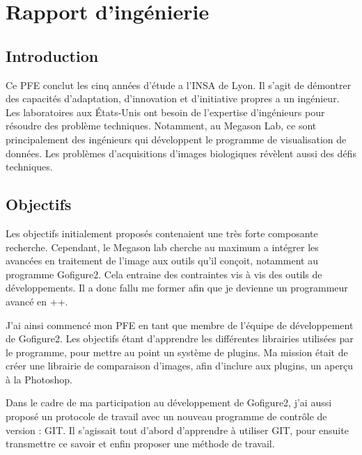 

\chapter{Rapport d'ingénierie} 








\section{Introduction}

Ce PFE conclut les cinq années d'étude a l'INSA de Lyon. 
Il s'agit de démontrer des capacités d'adaptation, d'innovation et d'initiative propres a un ingénieur. Les laboratoires aux 
États-Unis ont besoin de l'expertise d'ingénieurs pour résoudre des problème techniques. 
Notamment, au Megason Lab, ce sont principalement des ingénieurs qui développent le programme de visualisation de données. 
Les problèmes d'acquisitions d'images biologiques révèlent aussi des défis techniques.
 
\section{Objectifs}

Les objectifs initialement proposés contenaient une très forte composante recherche.
Cependant, le Megason lab cherche au maximum a intégrer les avancées en traitement de l'image aux outils qu'il conçoit,
 notamment au programme Gofigure2. Cela entraine des contraintes vis à vis des outils de développements. 
 Il a donc fallu me former afin que je devienne un programmeur avancé en {\C++}. 
 
J'ai ainsi commencé mon PFE en tant que membre de l'équipe de développement de Gofigure2.
 Les objectifs étant d'apprendre les différentes librairies utilisées par le programme, pour mettre au point un système de plugins. 
 Ma mission était de créer une librairie de comparaison d'images, afin d'inclure aux plugins, un aperçu à la Photoshop.

Dans le cadre de ma participation au développement de Gofigure2,
 j'ai aussi proposé un protocole de travail avec un nouveau programme de contrôle de version : GIT.
 Il s'agissait tout d'abord d'apprendre à utiliser GIT, pour ensuite transmettre ce savoir et enfin proposer une méthode de travail.


